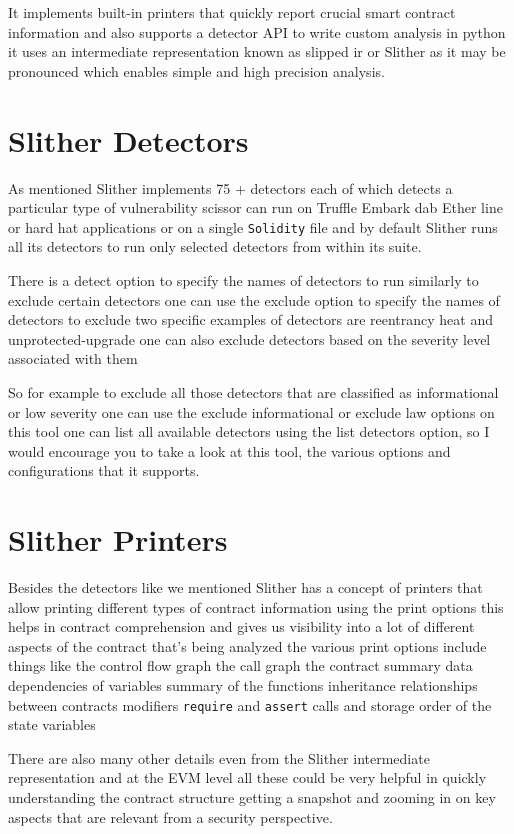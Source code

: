 It implements built-in printers that quickly report crucial smart contract information and also supports a detector API to write custom analysis in python it uses an intermediate representation known as slipped ir or Slither as it may be pronounced which enables simple and high precision analysis.

\section{Slither Detectors}

As mentioned Slither implements 75 + detectors each of which detects a particular type of vulnerability scissor can run on Truffle Embark dab Ether line or hard hat applications or on a single \verb|Solidity| file and by default Slither runs all its detectors to run only selected detectors from within its suite.

There is a detect option to specify the names of detectors to run similarly to exclude certain detectors one can use the exclude option to specify the names of detectors to exclude two specific examples of detectors are reentrancy heat and unprotected-upgrade one can also exclude detectors based on the severity level associated with them

So for example to exclude all those detectors that are classified as informational or low severity one can use the exclude informational or exclude law options on this tool one can list all available detectors using the list detectors option, so I would encourage you to take a look at this tool, the various options and configurations that it supports.

\section{Slither Printers}

Besides the detectors like we mentioned Slither has a concept of printers that allow printing different types of contract information using the print options this helps in contract comprehension and gives us visibility into a lot of different aspects of the contract that's being analyzed the various print options include things like the control flow graph the call graph the contract summary data dependencies of variables summary of the functions inheritance relationships between contracts modifiers \verb|require| and \verb|assert| calls and storage order of the state variables

There are also many other details even from the Slither intermediate representation and at the EVM level all these could be very helpful in quickly understanding the contract structure getting a snapshot and zooming in on key aspects that are relevant from a security perspective.


